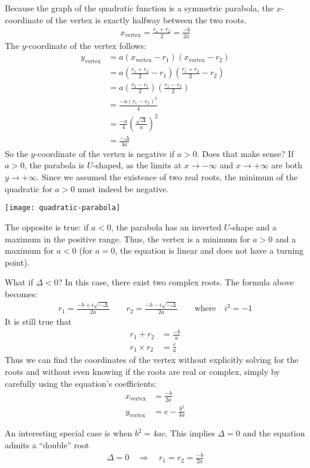 \documentclass[12pt]{article}
\begin{document}
\begin{answer}
Because the graph of the quadratic function is a symmetric parabola, the $x$-coordinate of the vertex is exactly halfway between the two roots.
\begin{align*}
x_{\text{vertex}} 
  = \frac{r_1+r_2}{2}
  = \frac{-b}{2a}
\end{align*}
The $y$-coordinate of the vertex follows: 
\begin{align*}
y_{\text{vertex}} 
  & = a (x_{\text{vertex}}-r_1)(x_{\text{vertex}}-r_2) \\
  & = a \left(\frac{r_1+r_2}{2}-r_1\right)\left(\frac{r_1+r_2}{2}-r_2\right) \\
  & = a \left(\frac{r_2-r_1}{2}\right)\left(\frac{r_1-r_2}{2}\right) \\
  & = \frac{-a\left(r_1-r_2\right)^2}{4} \\
  & = \frac{-a}{4}\left(\frac{\sqrt{\Delta}}{a}\right)^2 \\
  & = \frac{-\Delta}{4a}
\end{align*}
So the $y$-coordinate of the vertex is negative if $a>0$. Does that make sense? If $a>0$, the parabola is $U$-shaped, as the limits at $x\rightarrow-\infty$ and $x\rightarrow+\infty$ are both $y\rightarrow+\infty$. Since we assumed the existence of two real roots, the minimum of the quadratic for $a>0$ must indeed be negative. 
\begin{center}
\centering
\texttt{[image: quadratic-parabola]}
\end{center}
The opposite is true: if $a<0$, the parabola has an inverted $U$-shape and a maximum in the positive range. Thus, the vertex is a minimum for $a>0$ and a maximum for $a<0$ (for $a=0$, the equation is linear and does not have a turning point). 

What if $\Delta<0$? In this case, there exist two complex roots. The formula above becomes:
\begin{align*}
r_1 = \frac{-b+i\sqrt{-\Delta}}{2a}
  \qquad
r_2 = \frac{-b-i\sqrt{-\Delta}}{2a} 
  \qquad\text{where}\quad i^2 = -1
\end{align*}
It is still true that
\begin{align*}
r_1 + r_2 
  & = \frac{-b}{a} \\
r_1 \times r_2 
  & = \frac{c}{a}
\end{align*}
Thus we can find the coordinates of the vertex without explicitly solving for the roots and without even knowing if the roots are real or complex, simply by carefully using the equation's coefficients:
\begin{align*}
x_{\text{vertex}} & = \frac{-b}{2a} \\
y_{\text{vertex}} & = c - \frac{b^2}{4a}
\end{align*}

An interesting special case is when $b^2=4ac$. This implies $\Delta=0$ and the equation admits a ``double'' root 
\begin{align*}
\Delta = 0 \quad\Rightarrow\quad r_1 = r_2 = \frac{-b}{2a}
\end{align*}
\end{answer}
\end{document}
